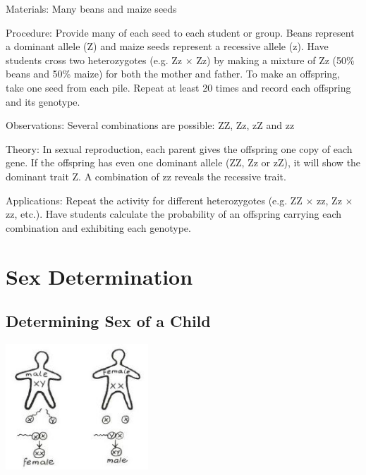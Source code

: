 \begin{multicols}{2}
\begin{description*}
\item[Materials:]{Many beans and maize seeds}
\item[Procedure:]{Provide many of each seed to each student or group. Beans represent a dominant allele (Z) and maize seeds represent a recessive allele (z). Have students cross two heterozygotes (e.g. Zz $\times$ Zz) by making a mixture of Zz (50\% beans and 50\% maize) for both the mother and father. To make an offspring, take one seed from each pile. Repeat at least 20 times and record each offspring and its genotype.}
\item[Observations:]{Several combinations are possible: ZZ, Zz, zZ and zz}
\item[Theory:]{In sexual reproduction, each parent gives the offspring one copy of each gene. If the offspring has even one dominant allele (ZZ, Zz or zZ), it will show the dominant trait Z. A combination of zz reveals the recessive trait.}
\item[Applications:]{Repeat the activity for different heterozygotes (e.g. ZZ $\times$ zz, Zz $\times$ zz, etc.). Have students calculate the probability of an offspring carrying each combination and exhibiting each genotype.}
\end{description*}


\section*{Sex Determination}


\subsection{Determining Sex of a Child}

\begin{center}
\includegraphics[width=0.4\textwidth]{./img/vso/sex-determination.jpg}
\end{center}


\end{multicols}
